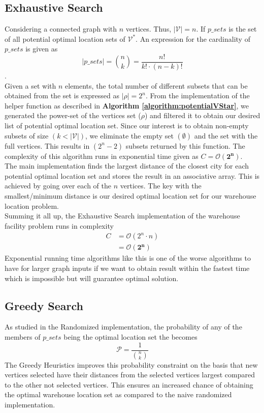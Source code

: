 \documentclass[longpaper, english, final, times]{revdetua}
\begin{document}
		\subsection{Exhaustive Search}
			Considering a connected graph with $n$ vertices. Thus, $|\mathcal{V}|=n$. If $p\_sets$ is the set of all potential optimal location sets of $\mathcal{V^{*}}$. An expression for the cardinality of $p\_sets$ is given as
			$$|p\_sets|={n\choose{k}} = \frac{n!}{k!\cdot (n-k)!}$$. \\
			
			Given a set with $n$ elements, the total number of different subsets that can be obtained from the set is expressed as $|\rho|=2^n$\cite{powerset_generation}. From the implementation of the helper function as described in \textbf{Algorithm \ref{algorithm:potentialVStar}}, we generated the power-set of the vertices set ($\rho$) and filtered it to obtain our desired list of potential optimal location set. Since our interest is to obtain non-empty subsets of size $(k<|\mathcal{V}|)$, we eliminate the empty set $(\emptyset)$ and the set with the full vertices. This results in $(2^{n}-2)$ subsets returned by this function. The complexity of this algorithm runs in exponential time given as $C = \mathbf{\mathcal{O}(2^n)}$.\\
			
			The main implementation finds the largest distance of the closest city for each potential optimal location set and stores the result in an associative array. This is achieved by going over each of the $n$ vertices. The key with the smallest/minimum distance is our desired optimal location set for our warehouse location problem.\\
			
			Summing it all up, the Exhaustive Search implementation of the warehouse facility problem runs in complexity
			\begin{align*}
				C & = \mathcal{O}\left(2^n \cdot n\right) \\
				& = \mathbf{\mathcal{O}\left(2^{n}\right)}
			\end{align*}
			Exponential running time algorithms like this is one of the worse algorithms to have for larger graph inputs if we want to obtain result within the fastest time which is impossible but will guarantee optimal solution.
			
		\subsection{Greedy Search}
			As studied in the Randomized implementation, the probability of any of the members of $p\_sets$ being the optimal location set the becomes
			$$\mathcal{P}=\frac{1}{{n\choose k}}$$ The Greedy Heuristics improves this probability constraint on the basis that new vertices selected have their distances from the selected vertices largest compared to the other not selected vertices. This ensures an increased chance of obtaining the optimal warehouse location set as compared to the naive randomized implementation.\\
			
\end{document}
